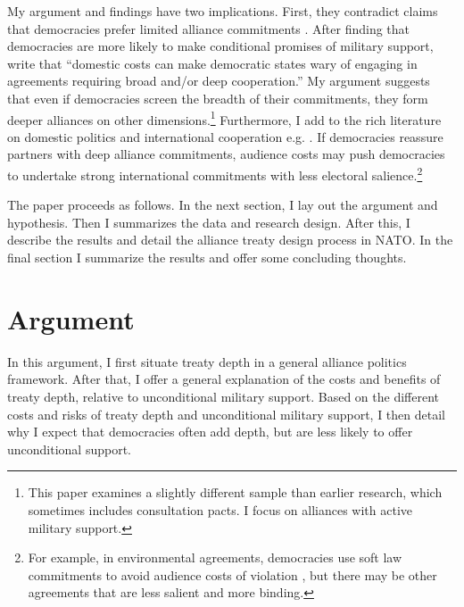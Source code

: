 \documentclass[12pt]{article}
\begin{document}
My argument and findings have two implications. 
First, they contradict claims that democracies prefer limited alliance commitments \citep{Mattes2012, Chibaetal2015, FjelstulReiter2019}. 
After finding that democracies are more likely to make conditional promises of military support, \citet{Chibaetal2015} write that ``domestic costs can make democratic states wary of engaging in agreements requiring broad and/or deep cooperation.'' 
My argument suggests that even if democracies screen the breadth of their commitments, they form deeper alliances on other dimensions.\footnote{This paper examines a slightly different sample than earlier research, which sometimes includes consultation pacts. I focus on alliances with active military support.}  
Furthermore, I add to the rich literature on domestic politics and international cooperation e.g. \citep{DownesRocke1995, Fearon1998, Leeds1999, MattesRodriguez2014}. 
If democracies reassure partners with deep alliance commitments, audience costs may push democracies to undertake strong international commitments with less electoral salience.\footnote{For example, in environmental agreements, democracies use soft law commitments to avoid audience costs of violation \citep{BoehmeltButkute2018}, but there may be other agreements that are less salient and more binding.} 


The paper proceeds as follows. 
In the next section, I lay out the argument and hypothesis. 
Then I summarizes the data and research design. 
After this, I describe the results and detail the alliance treaty design process in NATO.
In the final section I summarize the results and offer some concluding thoughts. 


\section{Argument}


In this argument, I first situate treaty depth in a general alliance politics framework.  
After that, I offer a general explanation of the costs and benefits of treaty depth, relative to unconditional military support. 
Based on the different costs and risks of treaty depth and unconditional military support, I then detail why I expect that democracies often add depth, but are less likely to offer unconditional support. 
\end{document}
